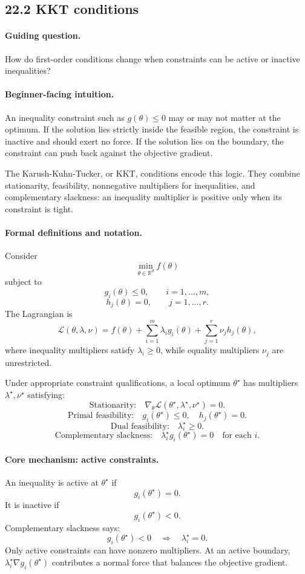 \subsection{22.2 KKT conditions}

\paragraph{Guiding question.}
How do first-order conditions change when constraints can be active or inactive inequalities?

\paragraph{Beginner-facing intuition.}
An inequality constraint such as \(g(\theta)\le 0\) may or may not matter at the optimum. If the solution lies strictly inside the feasible region, the constraint is inactive and should exert no force. If the solution lies on the boundary, the constraint can push back against the objective gradient.

The Karush-Kuhn-Tucker, or KKT, conditions encode this logic. They combine stationarity, feasibility, nonnegative multipliers for inequalities, and complementary slackness: an inequality multiplier is positive only when its constraint is tight.

\paragraph{Formal definitions and notation.}
Consider
\[
\min_{\theta\in\mathbb R^d} f(\theta)
\]
subject to
\[
g_i(\theta)\le 0,\qquad i=1,\ldots,m,
\]
\[
h_j(\theta)=0,\qquad j=1,\ldots,r.
\]
The Lagrangian is
\[
\boxed{
\mathcal L(\theta,\lambda,\nu)
=f(\theta)+\sum_{i=1}^m\lambda_i g_i(\theta)
+\sum_{j=1}^r\nu_j h_j(\theta),
}
\]
where inequality multipliers satisfy \(\lambda_i\ge 0\), while equality multipliers \(\nu_j\) are unrestricted.

Under appropriate constraint qualifications, a local optimum \(\theta^\star\) has multipliers \(\lambda^\star,\nu^\star\) satisfying:
\[
\text{Stationarity:}\quad
\nabla_\theta \mathcal L(\theta^\star,\lambda^\star,\nu^\star)=0.
\]
\[
\text{Primal feasibility:}\quad
g_i(\theta^\star)\le 0,\quad h_j(\theta^\star)=0.
\]
\[
\text{Dual feasibility:}\quad
\lambda_i^\star\ge 0.
\]
\[
\text{Complementary slackness:}\quad
\lambda_i^\star g_i(\theta^\star)=0
\quad\text{for each }i.
\]

\paragraph{Core mechanism: active constraints.}
An inequality is active at \(\theta^\star\) if
\[
g_i(\theta^\star)=0.
\]
It is inactive if
\[
g_i(\theta^\star)<0.
\]
Complementary slackness says:
\[
g_i(\theta^\star)<0\quad\Longrightarrow\quad \lambda_i^\star=0.
\]
Only active constraints can have nonzero multipliers. At an active boundary, \(\lambda_i^\star\nabla g_i(\theta^\star)\) contributes a normal force that balances the objective gradient.

